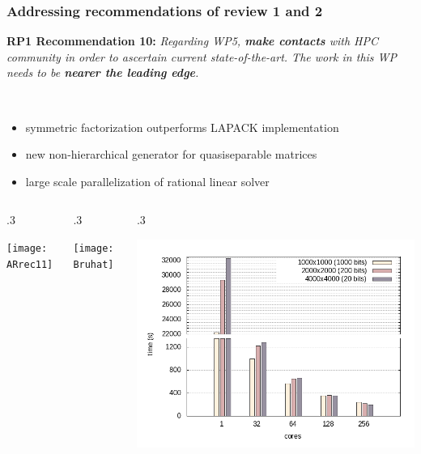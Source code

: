 \documentclass{beamer}
\begin{document}
\begin{frame}
 \frametitle{Addressing recommendations of review 1 and 2}
     \textbf{RP1 Recommendation 10:} \textit{Regarding WP5, \textbf{make contacts} with HPC community in order to ascertain current state-of-the-art. The work in this WP needs to be \textbf{nearer the leading edge}.}

    \begin{description}
    \item<2-> [Leading edge achievements in linear algebra] \
      {\small
      \begin{itemize}
      \item symmetric factorization outperforms LAPACK implementation
      \item new non-hierarchical generator for quasiseparable matrices
      \item large scale parallelization of rational linear solver
      \end{itemize}
      }
    \begin{columns}
      \begin{column} {.3\textwidth}
        \begin{center}
          \texttt{[image: ARrec11]}
      \end{center}
      \end{column}
      \begin{column} {.3\textwidth}
        \begin{center}
          \texttt{[image: Bruhat]}
        \end{center}
      \end{column}
      \begin{column} {.3\textwidth}
        \begin{center}
          \includegraphics[width=.9\textwidth]{nodes_histogram}

\end{center}
\end{column}
\end{columns}
\end{description}
\end{frame}
\end{document}

